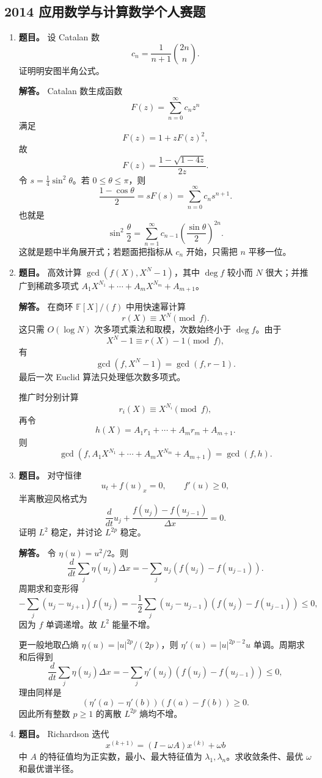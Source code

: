 ﻿\documentclass[UTF8,12pt]{ctexart}
\begin{document}
\subsection{2014 应用数学与计算数学个人赛题}
\begin{enumerate}[label=\textbf{\arabic*.},leftmargin=2.2em]
\item \textbf{题目。} 设 Catalan 数
\[
c_n=\frac1{n+1}\binom{2n}{n}.
\]
证明明安图半角公式。

\textbf{解答。} Catalan 数生成函数
\[
F(z)=\sum_{n=0}^\infty c_n z^n
\]
满足
\[
F(z)=1+zF(z)^2,
\]
故
\[
F(z)=\frac{1-\sqrt{1-4z}}{2z}.
\]
令 \(s=\frac14\sin^2\theta\)。若 \(0\le\theta\le\pi\)，则
\[
\frac{1-\cos\theta}{2}
=sF(s)
=\sum_{n=0}^\infty c_n s^{n+1}.
\]
也就是
\[
\sin^2\frac\theta2
=\sum_{n=1}^\infty c_{n-1}\left(\frac{\sin\theta}{2}\right)^{2n}.
\]
这就是题中半角展开式；若题面把指标从 \(c_n\) 开始，只需把 \(n\) 平移一位。

\item \textbf{题目。} 高效计算 \(\gcd(f(X),X^N-1)\)，其中 \(\deg f\) 较小而 \(N\) 很大；并推广到稀疏多项式 \(A_1X^{N_1}+\cdots+A_mX^{N_m}+A_{m+1}\)。

\textbf{解答。} 在商环 \(\mathbb F[X]/(f)\) 中用快速幂计算
\[
r(X)\equiv X^N\pmod f.
\]
这只需 \(O(\log N)\) 次多项式乘法和取模，次数始终小于 \(\deg f\)。由于
\[
X^N-1\equiv r(X)-1\pmod f,
\]
有
\[
\gcd(f,X^N-1)=\gcd(f,r-1).
\]
最后一次 Euclid 算法只处理低次数多项式。

推广时分别计算
\[
r_i(X)\equiv X^{N_i}\pmod f,
\]
再令
\[
h(X)=A_1r_1+\cdots+A_mr_m+A_{m+1}.
\]
则
\[
\gcd(f,A_1X^{N_1}+\cdots+A_mX^{N_m}+A_{m+1})=\gcd(f,h).
\]

\item \textbf{题目。} 对守恒律
\[
u_t+f(u)_x=0,\qquad f'(u)\ge0,
\]
半离散迎风格式为
\[
\frac d{dt}u_j+\frac{f(u_j)-f(u_{j-1})}{\Delta x}=0.
\]
证明 \(L^2\) 稳定，并讨论 \(L^{2p}\) 稳定。

\textbf{解答。} 令 \(\eta(u)=u^2/2\)。则
\[
\frac d{dt}\sum_j \eta(u_j)\Delta x
=-\sum_j u_j(f(u_j)-f(u_{j-1})).
\]
周期求和变形得
\[
-\sum_j (u_j-u_{j+1})f(u_j)
=-\frac12\sum_j (u_j-u_{j-1})(f(u_j)-f(u_{j-1}))\le0,
\]
因为 \(f\) 单调递增。故 \(L^2\) 能量不增。

更一般地取凸熵 \(\eta(u)=|u|^{2p}/(2p)\)，则 \(\eta'(u)=|u|^{2p-2}u\) 单调。周期求和后得到
\[
\frac d{dt}\sum_j \eta(u_j)\Delta x
=-\sum_j \eta'(u_j)(f(u_j)-f(u_{j-1}))
\le0,
\]
理由同样是
\[
(\eta'(a)-\eta'(b))(f(a)-f(b))\ge0.
\]
因此所有整数 \(p\ge1\) 的离散 \(L^{2p}\) 熵均不增。

\item \textbf{题目。} Richardson 迭代
\[
x^{(k+1)}=(I-\omega A)x^{(k)}+\omega b
\]
中 \(A\) 的特征值均为正实数，最小、最大特征值为 \(\lambda_1,\lambda_n\)。求收敛条件、最优 \(\omega\) 和最优谱半径。


\end{enumerate}
\end{document}
